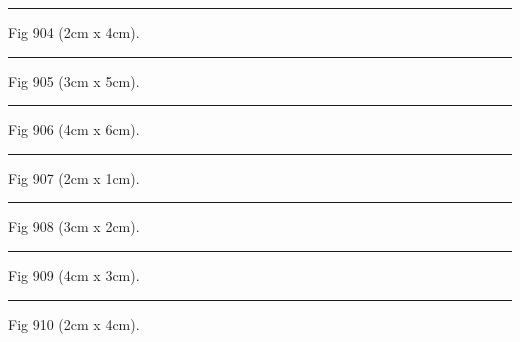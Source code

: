 \documentclass[a4paper,11pt]{article}
\begin{document}
\begin{swarmwrap}%
  \begin{minipage}[t]{2cm}
    \centering
    \rule{\linewidth}{4cm}
    {\footnotesize Fig 904 (2cm x 4cm).}
  \end{minipage}%
\end{swarmwrap}%
\swarmwrapnext
\lipsum[4]%

\begin{swarmwrap}%
  \begin{minipage}[t]{3cm}
    \centering
    \rule{\linewidth}{5cm}
    {\footnotesize Fig 905 (3cm x 5cm).}
  \end{minipage}%
\end{swarmwrap}%
\swarmwrapnext
\lipsum[5]%

\begin{swarmwrap}%
  \begin{minipage}[t]{4cm}
    \centering
    \rule{\linewidth}{6cm}
    {\footnotesize Fig 906 (4cm x 6cm).}
  \end{minipage}%
\end{swarmwrap}%
\swarmwrapnext
\lipsum[6]%

\begin{swarmwrap}%
  \begin{minipage}[t]{2cm}
    \centering
    \rule{\linewidth}{1cm}
    {\footnotesize Fig 907 (2cm x 1cm).}
  \end{minipage}%
\end{swarmwrap}%
\swarmwrapnext
\lipsum[7]%

\begin{swarmwrap}%
  \begin{minipage}[t]{3cm}
    \centering
    \rule{\linewidth}{2cm}
    {\footnotesize Fig 908 (3cm x 2cm).}
  \end{minipage}%
\end{swarmwrap}%
\swarmwrapnext
\lipsum[8]%

\begin{swarmwrap}%
  \begin{minipage}[t]{4cm}
    \centering
    \rule{\linewidth}{3cm}
    {\footnotesize Fig 909 (4cm x 3cm).}
  \end{minipage}%
\end{swarmwrap}%
\swarmwrapnext
\lipsum[9]%

\begin{swarmwrap}%
  \begin{minipage}[t]{2cm}
    \centering
    \rule{\linewidth}{4cm}
    {\footnotesize Fig 910 (2cm x 4cm).}
  \end{minipage}%
\end{swarmwrap}%
\swarmwrapnext
\lipsum[10]%
\end{document}
